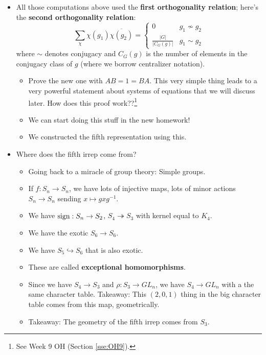 \documentclass[../notes.tex]{subfiles}
\begin{document}
\begin{itemize}
\begin{itemize}
        \item All those computations above used the \textbf{first orthogonality relation}; here's the \textbf{second orthogonality relation}:
        \begin{equation*}
            \sum_\chi\chi(g_1)\overline{\chi(g_2)} =
            \begin{cases}
                0 & g_1\nsim g_2\\
                \frac{|G|}{|C_G(g)|} & g_1\sim g_2
            \end{cases}
        \end{equation*}
        where $\sim$ denotes conjugacy and $C_G(g)$ is the number of elements in the conjugacy class of $g$ (where we borrow centralizer notation).
        \begin{itemize}
            \item Prove the new one with $AB=1=BA$. This very simple thing leads to a very powerful statement about systems of equations that we will discuss later. How does this proof work??\footnote{See Week 9 OH (Section \ref{sse:OH9}).}
            \item We can start doing this stuff in the new homework!
            \item We constructed the fifth representation using this.
        \end{itemize}
        \item Where does the fifth irrep come from?
        \begin{itemize}
            \item Going back to a miracle of group theory: Simple groups.
            \item If $f:S_n\to S_n$, we have lots of injective maps, lots of minor actions $S_n\to S_n$ sending $x\mapsto gxg^{-1}$.
            \item We have $\operatorname{sign}:S_n\to S_2$, $S_4\twoheadrightarrow S_3$ with kernel equal to $K_4$.
            \item We have the exotic $S_6\to S_6$.
            \item We have $S_5\hookrightarrow S_6$ that is also exotic.
            \item These are called \textbf{exceptional homomorphisms}.
            \item Since we have $S_4\to S_3$ and $\rho:S_3\to GL_n$, we have $S_4\to GL_n$ with a the same character table. Takeaway: This $(2,0,1)$ thing in the big character table comes from this map, geometrically.
            \item Takeaway: The geometry of the fifth irrep comes from $S_3$.

\end{itemize}
\end{itemize}
\end{itemize}
\end{document}
